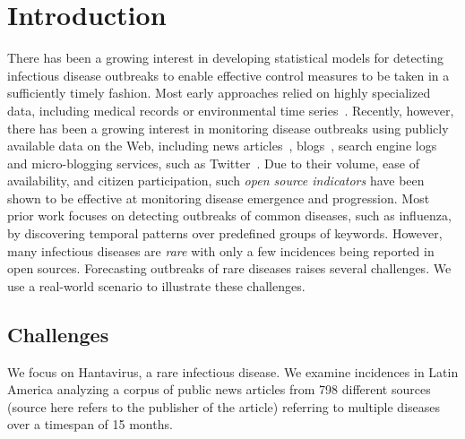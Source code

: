 \documentclass[twoside,leqno,twocolumn]{article}
\begin{document}
\section{Introduction}
\label{sec:intro}
There has been a growing interest in developing statistical models for detecting infectious disease outbreaks to enable effective control measures to be taken in a sufficiently timely fashion. Most early approaches relied on highly specialized data, including medical records or environmental time series~\cite{wong:02,wong:03}.  Recently, however, there has been a growing interest in monitoring disease outbreaks using publicly available data on the Web, including news articles~\cite{brownstein:2008,linge:09}, blogs~\cite{corley:10}, search engine logs~\cite{ginsberg:09} and micro-blogging services, such as Twitter~\cite{culotta:2010,parker:13, paul:11}. Due to their volume, ease of availability, and citizen participation, such {\em open source indicators} have been shown to be effective at monitoring disease emergence and progression. Most prior work focuses on detecting outbreaks of common diseases, such as influenza, by discovering temporal patterns over predefined groups of keywords. However, many infectious diseases are {\em rare} with only a few incidences being reported in open sources. Forecasting outbreaks of rare diseases raises several challenges. We use a real-world scenario to illustrate these challenges.

\subsection{Challenges}
\label{sec:challenges}
We focus on Hantavirus, a rare infectious disease. We examine incidences in Latin America analyzing a corpus of public news articles from 798 different sources (source here refers to the publisher of the article) referring to multiple diseases over a timespan of 15 months. 
\end{document}
